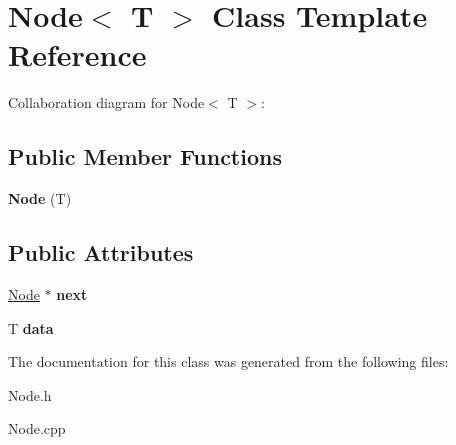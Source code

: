 \hypertarget{classNode}{}\section{Node$<$ T $>$ Class Template Reference}
\label{classNode}


Collaboration diagram for Node$<$ T $>$\+:
\subsection*{Public Member Functions}
\begin{DoxyCompactItemize}
\item 
\mbox{\label{classNode_ab2f2bd0551fbce8ee80741462c9c86ef}} 
{\bfseries Node} (T)
\end{DoxyCompactItemize}
\subsection*{Public Attributes}
\begin{DoxyCompactItemize}
\item 
\mbox{\label{classNode_ac1c0563946c59c36bddde431b4adb00b}} 
\hyperlink{classNode}{Node} $\ast$ {\bfseries next}
\item 
\mbox{\label{classNode_ac450c71a8677a38d306361f9ced518d3}} 
T {\bfseries data}
\end{DoxyCompactItemize}


The documentation for this class was generated from the following files\+:\begin{DoxyCompactItemize}
\item 
Node.\+h\item 
Node.\+cpp\end{DoxyCompactItemize}
